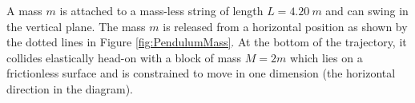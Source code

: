 \question A mass $m$ is attached to a mass-less string of length $L=\SI{4.20}{m}$ and can swing in the vertical plane. The mass $m$ is released from a horizontal position as shown by the dotted lines in Figure \ref{fig:PendulumMass}. At the bottom of the trajectory, it collides elastically head-on with a block of mass $M=2m$ which lies on a frictionless surface and is constrained to move in one dimension (the horizontal direction in the diagram).


